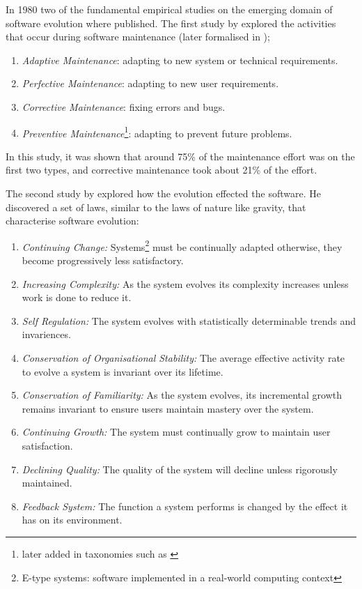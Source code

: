 In 1980 two of the fundamental empirical studies on the emerging domain of software evolution where published.
The first study by \cite{Lientz1980} explored the activities that occur during software maintenance (later formalised in \citep{IsoIec2006});
\begin{enumerate}
	\item \textit{Adaptive Maintenance}: adapting to new system or technical requirements.
	\item \textit{Perfective Maintenance}: adapting to new user requirements.
	\item \textit{Corrective Maintenance}: fixing errors and bugs.
	\item \textit{Preventive Maintenance}\footnote{later added in taxonomies such as \citep{iee1990ieee}}: adapting to prevent future problems.
\end{enumerate} 

In this study, it was shown that around 75\% of the maintenance effort was on the first two types, and corrective maintenance took about 21\% of the effort.

The second study by \cite{lehman1980} explored how the evolution effected the software.
He discovered a set of laws, similar to the laws of nature like gravity, that characterise software evolution:
\begin{enumerate}
  \item \textit{Continuing Change:} Systems\footnote{E-type systems: software implemented in a real-world computing context} must be continually adapted 
  otherwise, they become progressively less satisfactory.
  \item \textit{Increasing Complexity:} As the system evolves its complexity increases unless work is done to reduce it.
  \item \textit{Self Regulation:} The system evolves with statistically determinable trends and invariences.
  \item \textit{Conservation of Organisational Stability:} The average effective activity rate to evolve a system is invariant over its lifetime.
  \item \textit{Conservation of Familiarity:} As the system evolves, its incremental growth remains invariant to ensure users maintain mastery over the system.
  \item \textit{Continuing Growth:} The system must continually grow to maintain user satisfaction.
  \item \textit{Declining Quality:} The quality of the system will decline unless rigorously maintained.
  \item \textit{Feedback System:} The function a system performs is changed by the effect it has on its environment.
\end{enumerate}


